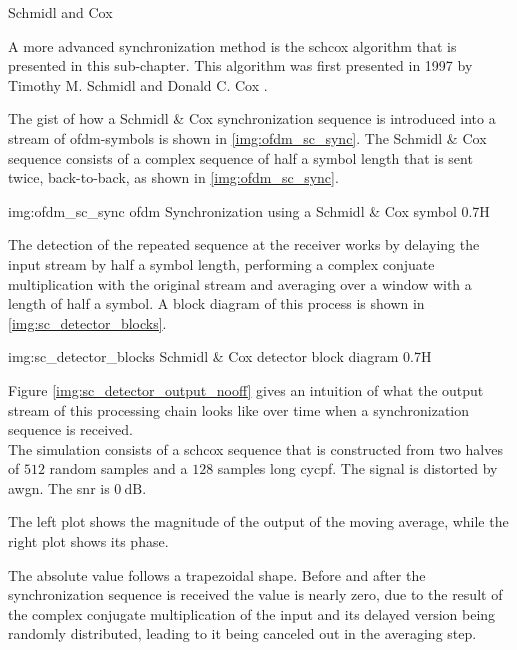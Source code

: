 \begin{subchapter}{Schmidl and Cox}
  \label{chap:intr_scsync}

  A more advanced synchronization method is
  the \acrlong{schcox} algorithm that is presented
  in this sub-chapter.
  This algorithm was first presented in 1997 by
  Timothy M. Schmidl and Donald C. Cox \cite{schmidlcox}.

  The gist of how a Schmidl \& Cox synchronization sequence
  is introduced into a stream of \gls{ofdm}-symbols is
  shown in \autoref{img:ofdm_sc_sync}.
  The Schmidl \& Cox sequence consists of a complex sequence
  of half a symbol length that is sent twice, back-to-back,
  as shown in \autoref{img:ofdm_sc_sync}.

               {img:ofdm_sc_sync}
               {\acrshort{ofdm} Synchronization using a Schmidl \& Cox symbol}
               {0.7}{H}

  The detection of the repeated sequence at the receiver works by delaying
  the input stream by half a symbol length, performing a complex conjuate
  multiplication with the original stream and averaging over a window with
  a length of half a symbol.
  A block diagram of this process is shown in \autoref{img:sc_detector_blocks}.

               {img:sc_detector_blocks}
               {Schmidl \& Cox detector block diagram}
               {0.7}{H}

  Figure \ref{img:sc_detector_output_nooff} gives an intuition
  of what the output stream of this processing chain looks like
  over time when a synchronization sequence is received. \\

  The simulation consists of a \gls{schcox} sequence
  that is constructed from two halves of $512$ random samples
  and a $128$ samples long \acrlong{cycpf}.
  The signal is distorted by \gls{awgn}.
  The \gls{snr} is $\SI{0}{\deci\bel}$.

  The left plot shows the magnitude of the output of
  the moving average, while the right plot shows its phase.

  The absolute value follows a trapezoidal shape.
  Before and after the synchronization sequence is received
  the value is nearly zero, due to the result of the complex
  conjugate multiplication of the input and its delayed version
  being randomly distributed, leading to it being canceled out
  in the averaging step.


\end{subchapter}
